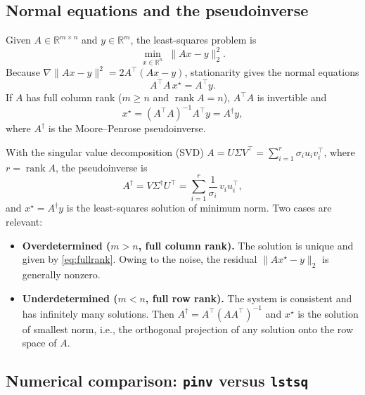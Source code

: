 \documentclass[11pt,a4paper]{article}
\newcommand{\R}{\mathbb{R}}
\newcommand{\T}{\top}
\begin{document}
\subsection{Normal equations and the pseudoinverse}

Given $A\in\R^{m\times n}$ and $y\in\R^m$, the least-squares problem is
\begin{equation}
\min_{x\in\R^n}\;\|Ax-y\|_2^2 .
\label{eq:ls}
\end{equation}
Because $\nabla\|Ax-y\|^2=2A^\T(Ax-y)$, stationarity gives the normal equations
\begin{equation}
A^\T A\,x^\star=A^\T y .
\label{eq:normal}
\end{equation}
If $A$ has full column rank ($m\ge n$ and $\operatorname{rank}A=n$), $A^\T A$ is invertible and
\begin{equation}
x^\star=(A^\T A)^{-1}A^\T y=A^\dagger y ,
\label{eq:fullrank}
\end{equation}
where $A^\dagger$ is the Moore--Penrose pseudoinverse.

With the singular value decomposition (SVD)
$A=U\Sigma V^\T=\sum_{i=1}^{r}\sigma_i u_i v_i^\T$, where $r=\operatorname{rank}A$, the
pseudoinverse is
\begin{equation}
A^\dagger=V\Sigma^\dagger U^\T=\sum_{i=1}^{r}\frac{1}{\sigma_i}\,v_i u_i^\T ,
\label{eq:svdpinv}
\end{equation}
and $x^\star=A^\dagger y$ is the least-squares solution of minimum norm. Two cases are relevant:
\begin{itemize}[leftmargin=1.4em,itemsep=1pt]
\item \textbf{Overdetermined ($m>n$, full column rank).} The solution is unique and given by
\eqref{eq:fullrank}. Owing to the noise, the residual $\|Ax^\star-y\|_2$ is generally nonzero.
\item \textbf{Underdetermined ($m<n$, full row rank).} The system is consistent and has
infinitely many solutions. Then $A^\dagger=A^\T(AA^\T)^{-1}$ and $x^\star$ is the solution of
smallest norm, i.e., the orthogonal projection of any solution onto the row space of $A$.
\end{itemize}

\subsection{Numerical comparison: \texttt{pinv} versus \texttt{lstsq}}
\end{document}
